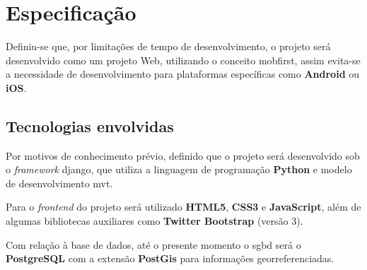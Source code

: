 \chapter{Especificação}\label{chp: Especificação}
Definiu-se que, por limitações de tempo de desenvolvimento, o projeto será desenvolvido como um projeto Web, utilizando o conceito \gls{mobfirst}, assim evita-se a necessidade de desenvolvimento para plataformas específicas como \textbf{Android} ou \textbf{iOS}.

\section{Tecnologias envolvidas}\label{sec: TecEnvolv}
Por motivos de conhecimento prévio, definido que o projeto será desenvolvido sob o \textit{framework} \gls{django}, que utiliza a linguagem de programação \textbf{Python} e modelo de desenvolvimento \gls{mvt}.

Para o \textit{frontend} do projeto será utilizado \textbf{HTML5}, \textbf{CSS3} e \textbf{JavaScript}, além de algumas bibliotecas auxiliares como \textbf{Twitter Bootstrap} (versão 3).

Com relação à base de dados, até o presente momento o \gls{sgbd} será o \textbf{PostgreSQL} com a extensão \textbf{PostGis} para informações georreferenciadas.




